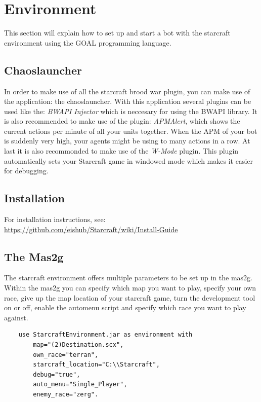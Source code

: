 \chapter{Environment}
This section will explain how to set up and start a bot with the starcraft environment using the GOAL programming language.

\section{Chaoslauncher}
In order to make use of all the starcraft brood war plugin, you can make use of the application: the chaoslauncher. With this application several plugins can be used like the: \textit{BWAPI Injector} which is neccesary for using the BWAPI library. It is also recommended to make use of the plugin: \textit{APMAlert}, which shows the current actions per minute of all your units together. When the APM of your bot is suddenly very high, your agents might be using to many actions in a row. At last it is also recommonded to make use of the \textit{W-Mode} plugin. This plugin automatically sets your Starcraft game in windowed mode which makes it easier for debugging. 

\section{Installation}
For installation instructions, see: \url{https://github.com/eishub/Starcraft/wiki/Install-Guide}

\section{The Mas2g}
\label{mas2g}
The starcraft environment offers multiple parameters to be set up in the mas2g. Within the mas2g you can specify which map you want to play, specify your own race, give up the map location of your starcraft game, turn the development tool on or off, enable the automenu script and specify which race you want to play against.

\begin{verbatim}
    use StarcraftEnvironment.jar as environment with
        map="(2)Destination.scx",
        own_race="terran",
        starcraft_location="C:\\Starcraft",
        debug="true",
        auto_menu="Single_Player",
        enemy_race="zerg".
\end{verbatim}

